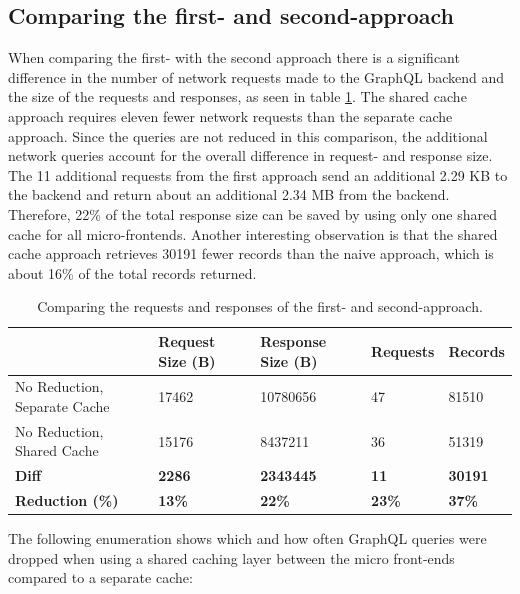 \subsection{Comparing the first- and second-approach}\label{subsection:results:comparison-first-second-approach}

When comparing the first- with the second approach there is a significant difference in the number of network requests made to the GraphQL backend and the size of the requests and responses, as seen in table \ref{table:results:size-comparison-first-path-no-cache-no-reduction-cache-no-reduction}. The shared cache approach requires eleven fewer network requests than the separate cache approach. Since the queries are not reduced in this comparison, the additional network queries account for the overall difference in request- and response size. The 11 additional requests from the first approach send an additional 2.29 KB to the backend and return about an additional 2.34 MB from the backend. Therefore, 22\% of the total response size can be saved by using only one shared cache for all micro-frontends. Another interesting observation is that the shared cache approach retrieves 30191 fewer records than the naive approach, which is about 16\% of the total records returned.

\ifshowTables
\begin{table}[H]
    \begin{tabular}{|l|l|l|l|l|}
    \hline
      & Request Size (B) & Response Size (B) & Requests & Records \\
    \hline
     No Reduction, Separate Cache & 17462 & 10780656 & 47 & 81510 \\
     \hline
     No Reduction, Shared Cache & 15176 & 8437211 & 36 & 51319 \\
     \hline
     \hline
     \textbf{Diff} & \textbf{2286} & \textbf{2343445} & \textbf{11} & \textbf{30191} \\
     \hline
     \textbf{Reduction (\%)} & \textbf{13\%} & \textbf{22\%} & \textbf{23\%} & \textbf{37\%} \\
     \hline
    \end{tabular}
    \caption{Comparing the requests and responses of the first- and second-approach.}
    \label{table:results:size-comparison-first-path-no-cache-no-reduction-cache-no-reduction}
\end{table}
\fi

\noindent The following enumeration shows which and how often GraphQL queries were dropped when using a shared caching layer between the micro front-ends compared to a separate cache:

